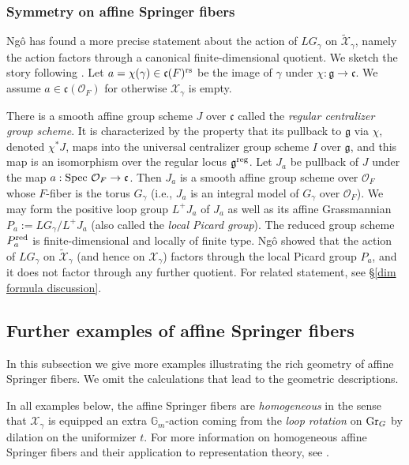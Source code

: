 \documentclass[]{pcmi}
\let\oldsubsubsection\subsubsection
\renewcommand{\subsubsection}[1]{%
\setcounter{subsubsection}{\value{equation}}%
\oldsubsubsection{#1}%
\refstepcounter{equation}%
}
\theoremstyle{plain}
\theoremstyle{definition}
\def\GG{\mathbb{G}}
\def\calO{\mathcal{O}}
\newcommand{\sX}{\ensuremath{\mathscr{X}}\xspace}
\newcommand{\sX}{\ensuremath{\mathcal{X}}\xspace}
\newcommand\frc{\mathfrak{c}}
\newcommand\frg{\mathfrak{g}}
\newcommand{\Gr}{\textup{Gr}}
\newcommand{\red}{\textup{red}}
\newcommand{\reg}{\textup{reg}}
\newcommand\rs{\textup{rs}}
\newcommand\Spec{\textup{Spec}\ }
\newcommand{\Gm}{\GG_m}
\newcommand{\wt}{\widetilde}
\newcommand{\tX}{\wt{\sX}}
\begin{document}
\subsubsection{Symmetry on affine Springer fibers}\label{sss:sym ASF} Ng\^o has found a more precise statement about the action of $LG_{\gamma}$ on $\tX_{\gamma}$, namely the action factors through a canonical finite-dimensional quotient. We sketch the story following \cite[\S3.3]{NgoFL}. Let $a=\chi(\gamma)\in\frc(F)^{\rs}$ be the image of $\gamma$ under $\chi:\frg\to \frc$. We assume $a\in\frc(\calO_{F})$ for otherwise $\sX_{\gamma}$ is empty. 

There is a smooth affine group scheme $J$ over $\frc$ called the {\em regular centralizer group scheme}. It is characterized by the property that its pullback to $\frg$ via $\chi$, denoted $\chi^{*}J$, maps into the universal centralizer group scheme $I$ over $\frg$, and this map is an isomorphism over the regular locus $\frg^{\reg}$. Let $J_{a}$ be pullback of $J$ under the map $a:\Spec\calO_{F}\to \frc$. Then $J_{a}$ is a smooth affine group scheme over $\calO_{F}$ whose $F$-fiber is the torus $G_{\gamma}$ (i.e., $J_{a}$ is an integral model of $G_{\gamma}$ over $\calO_{F}$). We may form the positive loop group $L^{+}J_{a}$ of $J_{a}$ as well as its affine Grassmannian $P_{a}:=LG_{\gamma}/L^{+}J_{a}$ (also called the {\em local Picard group}). The reduced group scheme $P^{\red}_{a}$ is finite-dimensional and locally of finite type. Ng\^o showed that the action of $LG_{\gamma}$ on $\tX_{\gamma}$ (and hence on $\sX_{\gamma}$) factors through the local Picard group $P_{a}$, and it does not factor through any further quotient. For related statement, see \S\ref{dim formula discussion}.
 


\subsection{Further examples of affine Springer fibers}\label{ss:aff examples}
In this subsection we give more examples illustrating the rich geometry of affine Springer fibers. We omit the calculations that lead to the geometric descriptions. 

In all examples below, the affine Springer fibers are {\em homogeneous} in the sense that $\sX_{\gamma}$ is equipped an extra $\Gm$-action coming from the {\em loop rotation} on $\Gr_{G}$ by dilation on the uniformizer $t$. For more information on homogeneous affine Springer fibers and their application to representation theory, see \cite{OY}. 
\end{document}

